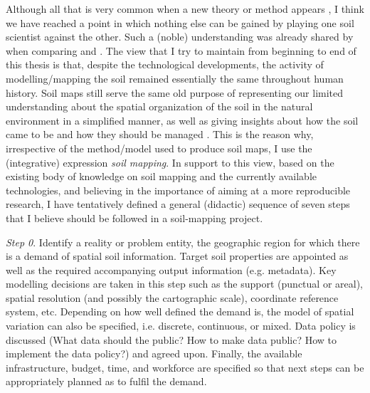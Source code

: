 Although all that is very common when a new theory or method appears 
\cite{Russell1932,Feyerabend1977,Kuhn2011}, I think we have reached a point in which nothing else 
can be gained by 
playing one soil scientist against the other. Such a (noble) understanding was already shared by 
 when comparing  and .
The view that I
try to maintain from beginning to end of this thesis is that, despite the technological developments,
the activity of modelling/mapping the soil remained essentially the same throughout human history. Soil 
maps still serve the same old purpose of representing our limited understanding about the spatial 
organization of the soil in the natural environment in a simplified manner, as well as giving 
insights about how the soil came to be and how they should be managed 
\cite{Jenny1941,Hudson1992,Legros2006,Blanco-CanquiEtAl2010,Grunwald2010}. This is the reason why,
irrespective of the method/model
used to produce soil maps, I use the (integrative) expression \emph{soil mapping}. In support to 
this view, based on the existing body of knowledge on soil mapping and the currently available 
technologies, and believing in the importance of aiming at a more reproducible research, I have 
tentatively defined a general (didactic) sequence of seven steps that I believe should be
followed in a soil-mapping project.

\noindent\textit{Step 0}. Identify a reality or problem entity, the geographic region for which 
there is a demand of spatial soil information. Target soil properties are appointed as well as the 
required accompanying output information (e.g. metadata). Key modelling decisions are taken in this step
such as the support (punctual or areal), spatial resolution (and possibly the cartographic scale),
coordinate reference system, etc. Depending on how well defined the demand is, the model of spatial 
variation can also be specified, i.e. discrete, continuous, or mixed. Data policy is discussed (What data
should the public? How to make data public? How to implement the data policy?) and agreed upon. Finally,
the available infrastructure, budget, time, and workforce are specified so that next steps can be 
appropriately planned as to fulfil the demand.

